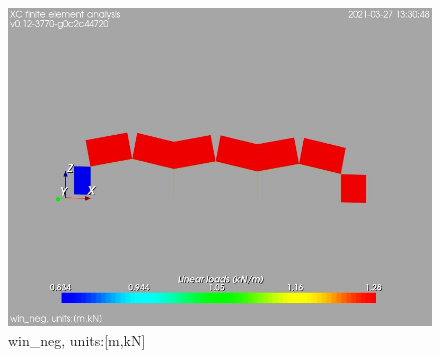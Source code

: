 \begin{figure}
\begin{center}
\includegraphics[width=\linewidth]{calc_results/sole_zeinali/text/graphics/loads/win_negallMemberSet}
\caption{win_neg, units:[m,kN]}
\label{win-neg-unitsmkn}
\end{center}
\end{figure}
